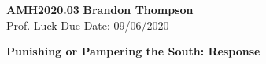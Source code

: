 \noindent
\textbf{AMH2020.03} \hfill \textbf{Brandon Thompson} \\
\normalsize Prof. Luck \hfill Due Date: 09/06/2020 \\

\begin{center}
\textbf{Punishing or Pampering the South: Response}
\end{center}